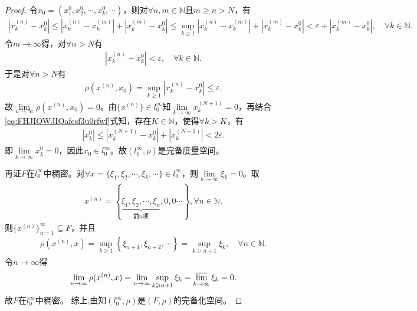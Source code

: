 \documentclass[../../main.tex]{subfiles}%
\begin{document}
\begin{proof}
令$x_0=(x_1^0,x_2^0,\cdots,x_k^0,\cdots)$，则对$\forall n,m\in\mathbb{N}$且$m\geqslant n>N$，有
\begin{align*}
\left|x_k^{(n)}-x_k^0\right|\leqslant\left|x_k^{(n)}-x_k^{(m)}\right|+\left|x_k^{(m)}-x_k^0\right|\leqslant\sup\limits_{k\geqslant 1}\left|x_k^{(n)}-x_k^{(m)}\right|+\left|x_k^{(m)}-x_k^0\right|<\varepsilon+\left|x_k^{(m)}-x_k^0\right|,\quad \forall k\in\mathbb{N}.
\end{align*}
令$m\rightarrow\infty$得，对$\forall n>N$有
\begin{align}\label{eq:FHJIOWJIOafesf3u0rfwf}
\left|x_k^{(n)}-x_k^0\right|<\varepsilon,\quad \forall k\in\mathbb{N}.
\end{align}
于是对$\forall n>N$有
\begin{align*}
\rho(x^{(n)},x_0)=\sup\limits_{k\geqslant 1}\left|x_k^{(n)}-x_k^0\right|\leqslant\varepsilon.
\end{align*}
故$\lim\limits_{n\rightarrow\infty}\rho(x^{(n)},x_0)=0$。由$\{x^{(n)}\}\in l_0^\infty$知$\lim\limits_{k\rightarrow\infty}x_k^{(N+1)}=0$，再结合\eqref{eq:FHJIOWJIOafesf3u0rfwf}式知，存在$K\in\mathbb{N}$，使得$\forall k>K$，有
\begin{align*}
\left|x_k^0\right|\leqslant\left|x_k^{(N+1)}-x_k^0\right|+\left|x_k^{(N+1)}\right|<2\varepsilon.
\end{align*}
即$\lim\limits_{k\rightarrow\infty}x_k^0=0$，因此$x_0\in l_0^\infty$。故$(l_0^\infty,\rho)$是完备度量空间。

再证$F$在$l_0^\infty$中稠密。对$\forall x=\{\xi_1,\xi_2,\cdots,\xi_k,\cdots\}\in l_0^\infty$，则$\lim\limits_{k\rightarrow\infty}\xi_k=0$。取
\begin{align*}
x^{(n)}=\left\{\underbrace{\xi_1,\xi_2,\cdots,\xi_n}_{\text{前}n\text{项}},0,0\cdots\right\},\forall n\in\mathbb{N}.
\end{align*}
则$\{x^{(n)}\}_{n=1}^{\infty}\subseteq F$，并且
\begin{align*}
\rho(x^{(n)},x)=\sup\limits_{k\geqslant 1}\left\{\xi_{n+1},\xi_{n+2},\cdots\right\}=\sup\limits_{k\geqslant n+1}\xi_k,\quad \forall n\in\mathbb{N}.
\end{align*}
令$n\rightarrow\infty$得
\begin{align*}
\lim\limits_{n\rightarrow\infty}\rho(x^{(n)},x)=\lim\limits_{n\rightarrow\infty}\sup\limits_{k\geqslant n+1}\xi_k=\varlimsup\limits_{k\rightarrow\infty}\xi_k=0.
\end{align*}
故$F$在$l_0^\infty$中稠密。
综上,由知$(l_0^\infty,\rho)$是$(F,\rho)$的完备化空间。
\end{proof}
\end{document}
